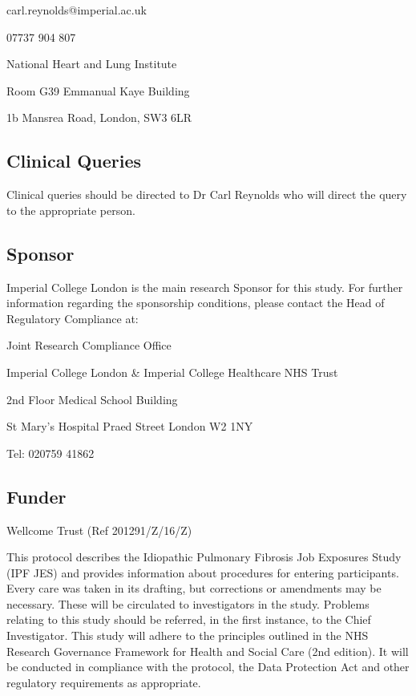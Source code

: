 \documentclass[a4paper,10pt]{article}
\begin{document}
\begin{flushleft}
carl.reynolds@imperial.ac.uk 

07737 904 807 

National Heart and Lung Institute

Room G39 Emmanual Kaye Building

1b Mansrea Road, London, SW3 6LR 


\subsection*{Clinical Queries}

Clinical queries should be directed to Dr Carl Reynolds who will direct the query to the appropriate person.

\subsection*{Sponsor}

Imperial College London is the main research Sponsor for this study. For further information regarding the sponsorship conditions, please contact the Head of Regulatory Compliance at:\vspace{0.5cm}
		
Joint Research Compliance Office

Imperial College London \& Imperial College Healthcare NHS Trust

2nd Floor Medical School Building

St Mary’s Hospital
Praed Street
London
W2 1NY

Tel: 020759 41862

\subsection*{Funder}


Wellcome Trust (Ref 201291/Z/16/Z) \vspace{0.5cm}

\end{flushleft}


This protocol describes the Idiopathic Pulmonary Fibrosis Job Exposures Study (IPF JES) and provides information about procedures for entering participants. Every care was taken in its drafting, but corrections or amendments may be necessary. These will be circulated to investigators in the study. Problems relating to this study should be referred, in the first instance, to the Chief Investigator. This study will adhere to the principles outlined in the NHS Research Governance Framework for Health and Social Care (2nd edition). It will be conducted in compliance with the protocol, the Data Protection Act and other regulatory requirements as appropriate. 
\end{document}
